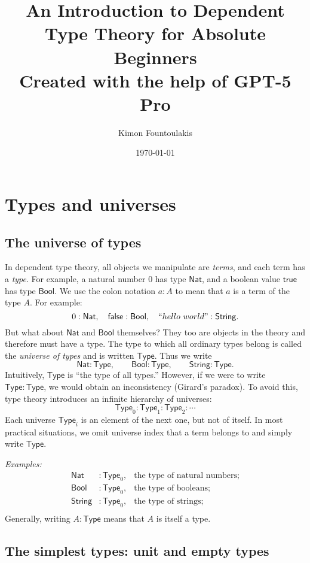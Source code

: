 \documentclass{article}
\title{An Introduction to Dependent Type Theory for Absolute Beginners \\\vspace{0.2cm} 
\small Created with the help of GPT-5 Pro}
\author{Kimon Fountoulakis}
\date{\today}
\newcommand{\Type}{\mathsf{Type}}
\newcommand{\Nat}{\mathsf{Nat}}
\newcommand{\Bool}{\mathsf{Bool}}
\newcommand{\String}{\mathsf{String}}
\begin{document}
\maketitle

\section{Types and universes}

\subsection*{The universe of types}

In dependent type theory, all objects we manipulate are \emph{terms}, and each term has a \emph{type}.  
For example, a natural number \(0\) has type \(\Nat\), and a boolean value \(\mathsf{true}\) has type \(\Bool\). We use the colon notation \(a : A\) to mean that \(a\) is a term of the type \(A\).  
For example:
\[
0 : \Nat, \quad \mathsf{false} : \Bool, \quad ``hello \ world" : \String.
\]
But what about \(\Nat\) and \(\Bool\) themselves?  
They too are objects in the theory and therefore must have a type.  
The type to which all ordinary types belong is called the \emph{universe of types} and is written \(\Type\).  
Thus we write
\[
\Nat : \Type, \qquad \Bool : \Type, \qquad \String : \Type.
\]
Intuitively, \(\Type\) is “the type of all types.”  
However, if we were to write \(\Type : \Type\), we would obtain an inconsistency (Girard’s paradox).  
To avoid this, type theory introduces an infinite hierarchy of universes:
\[
\Type_0 : \Type_1 : \Type_2 : \cdots
\]
Each universe \(\Type_i\) is an element of the next one, but not of itself.  
In most practical situations, we omit universe index that a term belongs to and simply write \(\Type\). 

\emph{Examples:}
\[
\begin{aligned}
\Nat &:\Type_0, &\text{the type of natural numbers;}\\
\Bool &:\Type_0, &\text{the type of booleans;}\\
\String &:\Type_0, &\text{the type of strings;}\\
\end{aligned}
\]
Generally, writing \(A : \Type\) means that \(A\) is itself a type.

\subsection*{The simplest types: unit and empty types}
\end{document}
